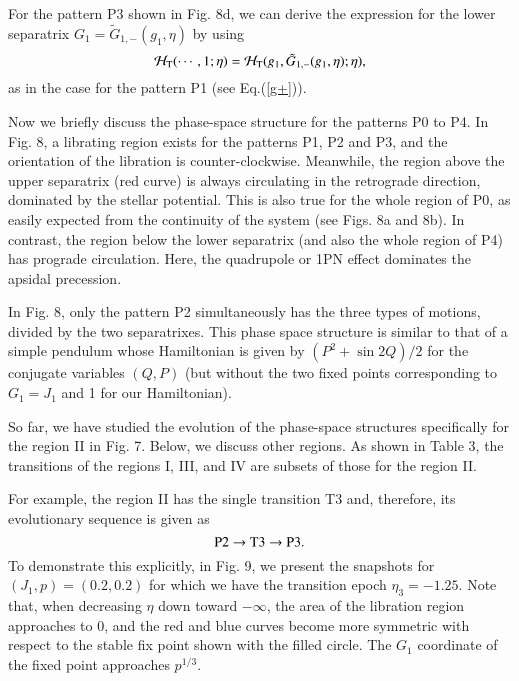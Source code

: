 \documentclass[useAMS,usenatbib,twocolumn]{mn2e}
\newcommand{\beq}{\begin{equation}}
\newcommand{\eeq}{\end{equation}}
\begin{document}
 For the pattern P3 shown in Fig. 8d, we can derive the expression for the lower separatrix $G_1=\tilde{G}_{1, -}(g_1,\eta)$ by using
\beq
\mathcal{H}_{\rm T}(\cdots, 1 ;
\eta)=\mathcal{H}_{\rm T}(g_1, \tilde{G}_{1,-}(g_1,\eta) ; \eta),
\eeq
as in the case for the pattern P1 (see Eq.(\ref{g+})).



Now we briefly discuss the phase-space structure for the patterns P0 to P4. 
In Fig. 8, a librating region exists for the patterns P1, P2 and P3, and the orientation of the libration is  counter-clockwise. Meanwhile, the region above the upper separatrix (red curve) is always  circulating in the retrograde direction, dominated by the stellar potential. This is also  true for the whole region of P0, as easily expected from the continuity of the system (see Figs. 8a and 8b).
In contrast, the region below the lower separatrix (and also the whole region of P4) has prograde circulation. Here, the quadrupole or 1PN effect dominates the apsidal precession. 


In Fig. 8,  only the pattern P2 simultaneously has the three types of motions,  divided by the two separatrixes. This phase space structure is similar to that of a simple pendulum whose Hamiltonian is given by
$
(P^2+\sin 2Q)/2
$
for the conjugate variables $(Q,P)$ (but without the two fixed points corresponding to  $G_1=J_1$ and 1 for our Hamiltonian).


So far, we have studied the evolution of the phase-space structures specifically for the region II in Fig. 7. Below, we discuss other regions. As shown in Table 3, the transitions of the regions I, III, and IV are subsets of those for the region II. 


For example, the region II has the single transition T3 and, therefore,  its evolutionary sequence is given as
$$
\rm P2 \to T3 \to P3.
$$
To demonstrate this explicitly, in Fig. 9, we present the snapshots for $(J_1,p)=(0.2,0.2)$ for which we have the transition epoch  $\eta_3=-1.25$. 
Note that, when decreasing $\eta$ down toward $-\infty$, the area of the libration region approaches to 0, and the red and blue curves become more symmetric with respect to the stable fix point shown with the filled circle. The $G_1$ coordinate of the fixed point approaches $p^{1/3}$.
\end{document}
